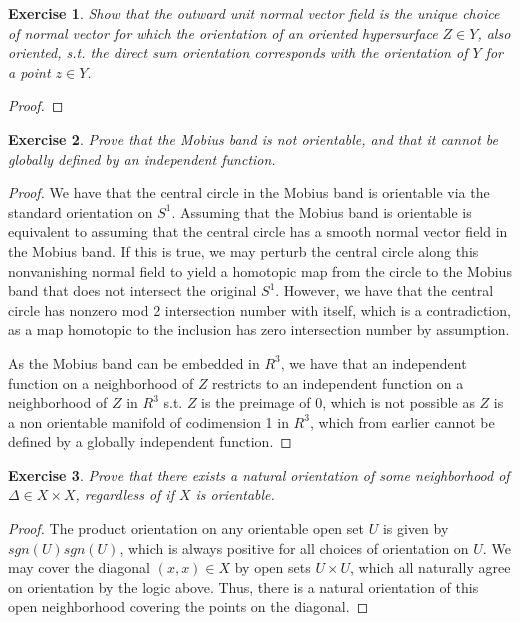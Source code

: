 \documentclass{article}
\newtheorem{exercise}{Exercise}
\begin{document}
\begin{exercise}
Show that the outward unit normal vector field is the unique choice of normal vector for which the orientation of an oriented hypersurface $Z \in Y$, also oriented, s.t. the direct sum orientation corresponds with the orientation of $Y$ for a point $z \in Y$.   
\end{exercise}

\begin{proof}
  
\end{proof}

\begin{exercise}
Prove that the Mobius band is not orientable, and that it cannot be globally defined by an independent function.   
\end{exercise}

\begin{proof}
  We have that the central circle in the Mobius band is orientable via the standard orientation on $S^{1}$. Assuming that the Mobius band is orientable is equivalent to assuming that the central circle has a smooth normal vector field in the Mobius band. If this is true, we may perturb the central circle along this nonvanishing normal field to yield a homotopic map from the circle to the Mobius band that does not intersect the original $S^{1}$. However, we have that the central circle has nonzero mod 2 intersection number with itself, which is a contradiction, as a map homotopic to the inclusion has zero intersection number by assumption. \newline

  As the Mobius band can be embedded in $R^{3}$, we have that an independent function on a neighborhood of $Z$ restricts to an independent function on a neighborhood of $Z$ in $R^{3}$ s.t. $Z$ is the preimage of 0, which is not possible as $Z$ is a non orientable manifold of codimension 1 in $R^{3}$, which from earlier cannot be defined by a globally independent function. 
\end{proof}

\begin{exercise}
  Prove that there exists a natural orientation of some neighborhood of $\Delta \in X \times X$, regardless of if $X$ is orientable. 
\end{exercise}

\begin{proof}
  The product orientation on any orientable open set $U$ is given by $sgn(U)sgn(U)$, which is always positive for all choices of orientation on $U$. We may cover the diagonal $(x,x) \in X$ by open sets $U \times U$, which all naturally agree on orientation by the logic above. Thus, there is a natural orientation of this open neighborhood covering the points on the diagonal. 
\end{proof}
\end{document}
